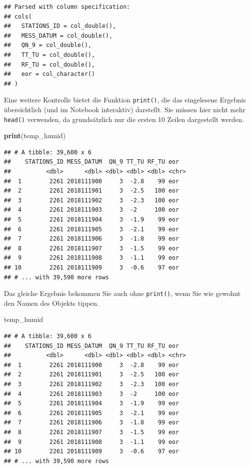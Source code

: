 \documentclass[]{book}
\newenvironment{Shaded}{\begin{snugshade}}{\end{snugshade}}
\newcommand{\KeywordTok}[1]{\textcolor[rgb]{0.13,0.29,0.53}{\textbf{#1}}}
\newcommand{\NormalTok}[1]{#1}
\begin{document}
\begin{verbatim}
## Parsed with column specification:
## cols(
##   STATIONS_ID = col_double(),
##   MESS_DATUM = col_double(),
##   QN_9 = col_double(),
##   TT_TU = col_double(),
##   RF_TU = col_double(),
##   eor = col_character()
## )
\end{verbatim}

Eine weitere Kontrolle bietet die Funktion \texttt{print()}, die das eingelesene Ergebnis übersichtlich (und im Notebook interaktiv) darstellt. Sie müssen hier nicht mehr \texttt{head()} verwenden, da grundsätzlich nur die ersten 10 Zeilen dargestellt werden.

\begin{Shaded}
\begin{Highlighting}[]
\KeywordTok{print}\NormalTok{(temp_humid)}
\end{Highlighting}
\end{Shaded}

\begin{verbatim}
## # A tibble: 39,600 x 6
##    STATIONS_ID MESS_DATUM  QN_9 TT_TU RF_TU eor  
##          <dbl>      <dbl> <dbl> <dbl> <dbl> <chr>
##  1        2261 2018111900     3  -2.8    99 eor  
##  2        2261 2018111901     3  -2.5   100 eor  
##  3        2261 2018111902     3  -2.3   100 eor  
##  4        2261 2018111903     3  -2     100 eor  
##  5        2261 2018111904     3  -1.9    99 eor  
##  6        2261 2018111905     3  -2.1    99 eor  
##  7        2261 2018111906     3  -1.8    99 eor  
##  8        2261 2018111907     3  -1.5    99 eor  
##  9        2261 2018111908     3  -1.1    99 eor  
## 10        2261 2018111909     3  -0.6    97 eor  
## # ... with 39,590 more rows
\end{verbatim}

Das gleiche Ergebnis bekommen Sie auch ohne \texttt{print()}, wenn Sie wie gewohnt den Namen des Objekts tippen.

\begin{Shaded}
\begin{Highlighting}[]
\NormalTok{temp_humid}
\end{Highlighting}
\end{Shaded}

\begin{verbatim}
## # A tibble: 39,600 x 6
##    STATIONS_ID MESS_DATUM  QN_9 TT_TU RF_TU eor  
##          <dbl>      <dbl> <dbl> <dbl> <dbl> <chr>
##  1        2261 2018111900     3  -2.8    99 eor  
##  2        2261 2018111901     3  -2.5   100 eor  
##  3        2261 2018111902     3  -2.3   100 eor  
##  4        2261 2018111903     3  -2     100 eor  
##  5        2261 2018111904     3  -1.9    99 eor  
##  6        2261 2018111905     3  -2.1    99 eor  
##  7        2261 2018111906     3  -1.8    99 eor  
##  8        2261 2018111907     3  -1.5    99 eor  
##  9        2261 2018111908     3  -1.1    99 eor  
## 10        2261 2018111909     3  -0.6    97 eor  
## # ... with 39,590 more rows
\end{verbatim}
\end{document}
